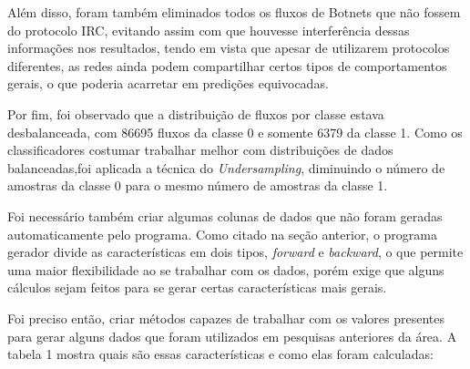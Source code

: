 Além disso, foram também eliminados todos os fluxos de Botnets que não fossem do protocolo IRC, evitando assim com que houvesse interferência dessas informações nos resultados, tendo em vista que apesar de utilizarem protocolos diferentes, as redes ainda podem compartilhar certos tipos de comportamentos gerais, o que poderia acarretar em predições equivocadas.

Por fim, foi observado que a distribuição de fluxos por classe estava desbalanceada, com 86695 fluxos da classe 0 e somente 6379 da classe 1. Como os classificadores costumar trabalhar melhor com distribuições de dados balanceadas,foi aplicada a técnica do \textit{Undersampling}, diminuindo o número de amostras da classe 0 para o mesmo número de amostras da classe 1.

Foi necessário também criar algumas colunas de dados que não foram geradas automaticamente pelo programa. Como citado na seção anterior, o programa gerador divide as características em dois tipos, \textit{forward} e \textit{backward}, o que permite uma maior flexibilidade ao se trabalhar com os dados, porém exige que alguns cálculos sejam feitos para se gerar certas características mais gerais.

Foi preciso então, criar métodos capazes de trabalhar com os valores presentes para gerar alguns dados que foram utilizados em pesquisas anteriores da área. A tabela 1 mostra quais são essas características e como elas foram calculadas:

